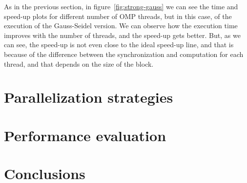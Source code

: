 As in the previous section, in figure~\ref{fig:strong-gauss} we can see the time and speed-up plots for different number 
of OMP threads, but in this case, of the execution of the Gauss-Seidel version. We can observe how the execution time improves with the number of threads, and the speed-up gets better. But, as we can see, the speed-up is not even close to the ideal speed-up line, and that is because of the difference between the synchronization and computation for each thread, and that depends on the size of the block.



\section{Parallelization strategies}%
\label{sec:parallelization_strategies}

\section{Performance evaluation}%
\label{sec:performance_evaluation}

\section{Conclusions}%
\label{sec:conclusions}






